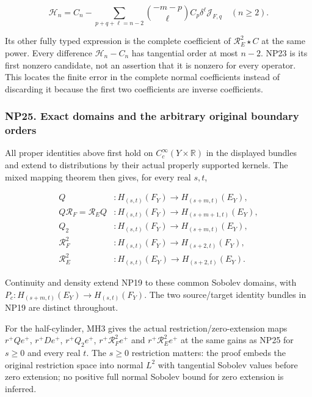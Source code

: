 \documentclass[
  11pt,
]{article}
\begin{document}
\[
 \mathcal H_n=C_n-
  \sum_{p+q+\ell=n-2}
       \binom{-m-p}{\ell}C_p\delta^\ell\mathcal J_{F,q}
 \quad(n\ge2).
 \tag{NP24}
\]

Its other fully typed expression is the complete coefficient of
\(\mathcal R _E^2\star C\) at the same power. Every difference
\(\mathcal H _n-C_n\) has tangential order at most \(n-2\). NP23 is its
first nonzero candidate, not an assertion that it is nonzero for every
operator. This locates the finite error in the complete normal
coefficients instead of discarding it because the first two coefficients
are inverse coefficients.

\subsubsection{NP25. Exact domains and the arbitrary original boundary
orders}\label{np25.-exact-domains-and-the-arbitrary-original-boundary-orders}

All proper identities above first hold on
\(C_c^\infty(Y\times\mathbb R)\) in the displayed bundles and extend to
distributions by their actual properly supported kernels. The mixed
mapping theorem then gives, for every real \(s,t\),

\[
 \begin{aligned}
 Q &:H_{(s,t)}(F_Y)\to H_{(s+m,t)}(E_Y),\\
 Q\mathcal R_F=\mathcal R_EQ &:H_{(s,t)}(F_Y)\to H_{(s+m+1,t)}(E_Y),\\
 Q_2 &:H_{(s,t)}(F_Y)\to H_{(s+m,t)}(E_Y),\\
 \mathcal R_F^2 &:H_{(s,t)}(F_Y)\to H_{(s+2,t)}(F_Y),\\
 \mathcal R_E^2 &:H_{(s,t)}(E_Y)\to H_{(s+2,t)}(E_Y).
 \end{aligned}
 \tag{NP25}
\]

Continuity and density extend NP19 to these common Sobolev domains, with
\(P_c:H_{(s+m,t)}(E_Y)\to H_{(s,t)}(F_Y)\). The two source/target
identity bundles in NP19 are distinct throughout.

For the half-cylinder, MH3 gives the actual restriction/zero-extension
maps \(r^+Qe^+\), \(r^+De^+\), \(r^+Q_2e^+\), \(r^+\mathcal R _F^2e^+\)
and \(r^+\mathcal R _E^2e^+\) at the same gains as NP25 for \(s\ge0\)
and every real \(t\). The \(s\ge0\) restriction matters: the proof
embeds the original restriction space into normal \(L^2\) with
tangential Sobolev values before zero extension; no positive full normal
Sobolev bound for zero extension is inferred.
\end{document}
